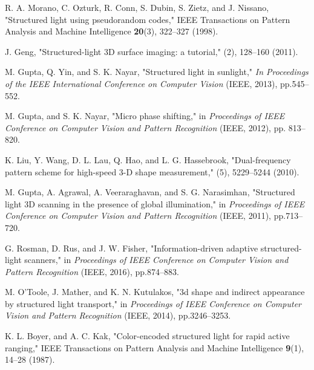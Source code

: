 \documentclass[10pt]{article}
\begin{document}

\begin{thebibliography}{99}

 R. A. Morano, C. Ozturk, R. Conn, S. Dubin, S. Zietz, and J. Nissano, "Structured light using pseudorandom codes," IEEE Transactions on Pattern Analysis and Machine Intelligence {\bfseries 20}(3), 322--327 (1998).

  J. Geng, "Structured-light 3D surface imaging: a tutorial," (2), 128--160 (2011).

 M. Gupta, Q. Yin, and S. K. Nayar, "Structured light in sunlight," {\itshape In Proceedings of the IEEE International Conference on Computer Vision} (IEEE, 2013), pp.545--552.

 M. Gupta,  and S. K. Nayar,  "Micro phase shifting," in {\itshape Proceedings of IEEE Conference on Computer Vision and Pattern
Recognition} (IEEE, 2012), pp. 813--820.

  K. Liu, Y. Wang,  D. L. Lau, Q. Hao, and L. G. Hassebrook,  "Dual-frequency pattern scheme for high-speed 3-D shape measurement," (5), 5229--5244 (2010). 

 M. Gupta,  A. Agrawal, A. Veeraraghavan, and S. G. Narasimhan, "Structured light 3D scanning in the presence of global illumination," in {\itshape Proceedings of IEEE Conference on Computer Vision and Pattern
Recognition} (IEEE, 2011), pp.713--720.

 G. Rosman,  D. Rus, and J. W. Fisher, "Information-driven adaptive structured-light scanners," in {\itshape Proceedings of IEEE Conference on Computer Vision and Pattern Recognition} (IEEE, 2016), pp.874--883.

 M. O'Toole, J.  Mather, and K. N. Kutulakos, "3d shape and indirect appearance by structured light transport," in {\itshape Proceedings of IEEE Conference on Computer Vision and Pattern Recognition} (IEEE, 2014), pp.3246--3253.

  K. L. Boyer, and A. C. Kak,  "Color-encoded structured light for rapid active ranging," IEEE Transactions on Pattern Analysis and Machine Intelligence {\bfseries 9}(1), 14--28 (1987).


\end{thebibliography}
\end{document}
